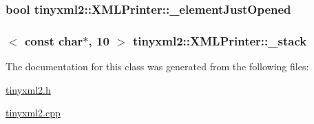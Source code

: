 \subsubsection[{\+\_\+element\+Just\+Opened}]{\setlength{\rightskip}{0pt plus 5cm}bool tinyxml2\+::\+X\+M\+L\+Printer\+::\+\_\+element\+Just\+Opened\hspace{0.3cm}{\ttfamily [protected]}}\label{classtinyxml2_1_1_x_m_l_printer_ac07169d58b465214a2b1fa306e617c26}
\hypertarget{classtinyxml2_1_1_x_m_l_printer_a99d59e67e084714541bee3ae43884bef}{}
\subsubsection[{\+\_\+stack}]{$<$ const char$\ast$, 10 $>$ tinyxml2\+::\+X\+M\+L\+Printer\+::\+\_\+stack\hspace{0.3cm}{\ttfamily [protected]}}\label{classtinyxml2_1_1_x_m_l_printer_a99d59e67e084714541bee3ae43884bef}


The documentation for this class was generated from the following files\+:\begin{DoxyCompactItemize}
\item 
\hyperlink{tinyxml2_8h}{tinyxml2.\+h}\item 
\hyperlink{tinyxml2_8cpp}{tinyxml2.\+cpp}\end{DoxyCompactItemize}
